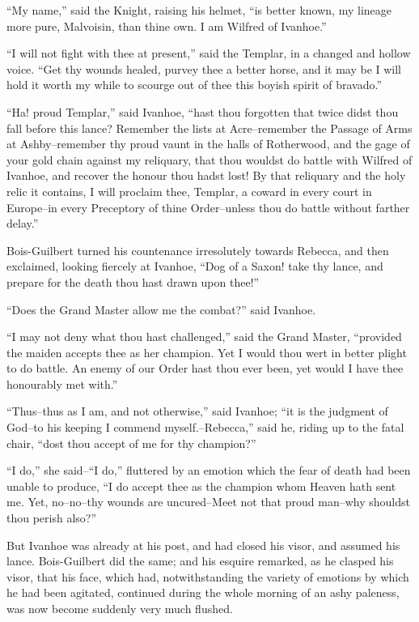 ``My name,'' said the Knight, raising his helmet, ``is better known, my
lineage more pure, Malvoisin, than thine own. I am Wilfred of Ivanhoe.''

``I will not fight with thee at present,'' said the Templar, in a
changed and hollow voice. ``Get thy wounds healed, purvey thee a better
horse, and it may be I will hold it worth my while to scourge out of
thee this boyish spirit of bravado.''

``Ha! proud Templar,'' said Ivanhoe, ``hast thou forgotten that twice
didst thou fall before this lance? Remember the lists at Acre--remember
the Passage of Arms at Ashby--remember thy proud vaunt in the halls of
Rotherwood, and the gage of your gold chain against my reliquary, that
thou wouldst do battle with Wilfred of Ivanhoe, and recover the honour
thou hadst lost! By that reliquary and the holy relic it contains, I
will proclaim thee, Templar, a coward in every court in Europe--in every
Preceptory of thine Order--unless thou do battle without farther
delay.''

Bois-Guilbert turned his countenance irresolutely towards Rebecca, and
then exclaimed, looking fiercely at Ivanhoe, ``Dog of a Saxon! take thy
lance, and prepare for the death thou hast drawn upon thee!''

``Does the Grand Master allow me the combat?'' said Ivanhoe.

``I may not deny what thou hast challenged,'' said the Grand Master,
``provided the maiden accepts thee as her champion. Yet I would thou
wert in better plight to do battle. An enemy of our Order hast thou ever
been, yet would I have thee honourably met with.''

``Thus--thus as I am, and not otherwise,'' said Ivanhoe; ``it is the
judgment of God--to his keeping I commend myself.--Rebecca,'' said he,
riding up to the fatal chair, ``dost thou accept of me for thy
champion?''

``I do,'' she said--``I do,'' fluttered by an emotion which the fear of
death had been unable to produce, ``I do accept thee as the champion
whom Heaven hath sent me. Yet, no--no--thy wounds are uncured--Meet not
that proud man--why shouldst thou perish also?''

But Ivanhoe was already at his post, and had closed his visor, and
assumed his lance. Bois-Guilbert did the same; and his esquire remarked,
as he clasped his visor, that his face, which had, notwithstanding the
variety of emotions by which he had been agitated, continued during the
whole morning of an ashy paleness, was now become suddenly very much
flushed.

